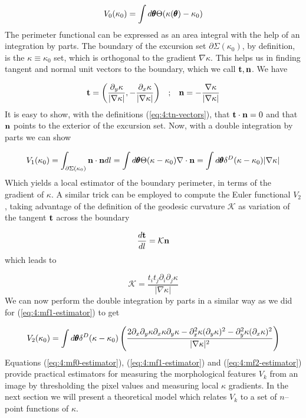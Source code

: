 \begin{equation}
\label{eq:4:mf0-estimator}
V_0(\kappa_0) = \int d\pmb{\theta} \Theta(\kappa(\pmb{\theta})-\kappa_0)
\end{equation} 
%
The perimeter functional can be expressed as an area integral with the help of an integration by parts. The boundary of the excursion set $\partial \Sigma(\kappa_0)$, by definition, is the $\kappa\equiv\kappa_0$ set, which is orthogonal to the gradient $\nabla \kappa$. This helps us in finding tangent and normal unit vectors to the boundary, which we call $\mathbf{t},\mathbf{n}$. We have

\begin{equation}
\label{eq:4:tn-vectors}
\begin{matrix}
\displaystyle \mathbf{t} = \left(\frac{\partial_y \kappa}{\vert\nabla\kappa\vert},-\frac{\partial_x \kappa}{\vert\nabla\kappa\vert}\right) & ; & \displaystyle \mathbf{n} = -\frac{\nabla \kappa}{\vert\nabla\kappa\vert} 
\end{matrix}
\end{equation} 
%
It is easy to show, with the definitions (\ref{eq:4:tn-vectors}), that $\mathbf{t}\cdot\mathbf{n}=0$ and that $\mathbf{n}$ points to the exterior of the excursion set. Now, with a double integration by parts we can show

\begin{equation}
\label{eq:4:mf1-estimator}
V_1(\kappa_0) = \int_{\partial\Sigma(\kappa_0)}\mathbf{n}\cdot\mathbf{n}dl = \int d\pmb{\theta} \Theta(\kappa-\kappa_0) \nabla\cdot \mathbf{n} = \int d\pmb{\theta} \delta^D(\kappa-\kappa_0)\vert\nabla\kappa\vert
\end{equation}
%
Which yields a local estimator of the boundary perimeter, in terms of the gradient of $\kappa$. A similar trick can be employed to compute the Euler functional $V_2$, taking advantage of the definition of the geodesic curvature $\mathcal{K}$ as variation of the tangent $\mathbf{t}$ across the boundary

\begin{equation}
\label{eq:4:geocurv}
\frac{d\mathbf{t}}{dl} = \mathcal{K}\mathbf{n}
\end{equation}
%
which leads to 

\begin{equation}
\label{eq:4:geocurv-2}
\mathcal{K} = \frac{t_it_j\partial_i\partial_j\kappa}{\vert\nabla\kappa\vert}
\end{equation}
%
We can now perform the double integration by parts in a similar way as we did for (\ref{eq:4:mf1-estimator}) to get

\begin{equation}
\label{eq:4:mf2-estimator}
V_2(\kappa_0) = \int d\pmb{\theta} \delta^D(\kappa-\kappa_0)\left(\frac{2\partial_x\partial_y\kappa\partial_x\kappa\partial_y\kappa-\partial^2_x\kappa(\partial_y\kappa)^2-\partial_y^2\kappa(\partial_x\kappa)^2}{\vert\nabla\kappa\vert^2}\right)
\end{equation}
%
Equations (\ref{eq:4:mf0-estimator}), (\ref{eq:4:mf1-estimator}) and (\ref{eq:4:mf2-estimator}) provide practical estimators for measuring the morphological features $V_k$ from an image by thresholding the pixel values and measuring local $\kappa$ gradients. In the next section we will present a theoretical model which relates $V_k$ to a set of $n$--point functions of $\kappa$.  

